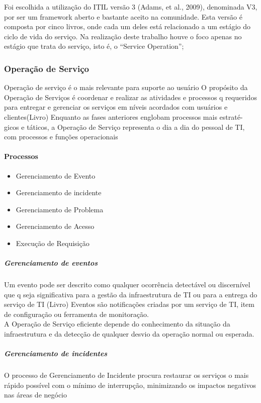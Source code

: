 \documentclass[11pt,a4paper]{article}
\begin{document}
Foi escolhida a utilização do ITIL versão 3 (Adams, et al., 2009), denominada
V3, por ser um framework aberto e bastante aceito na comunidade. Esta versão é
composta por cinco livros, onde cada um deles está relacionado a um estágio do
ciclo de vida do serviço. Na realização deste trabalho houve o foco apenas no
estágio que trata do serviço, isto é, o “Service Operation”;\\

\subsubsection{Operação de Serviço}
Operação de serviço é o mais relevante para suporte ao usuário
O propósito da Operação de Serviços é coordenar e realizar as atividades e processos q
requeridos para entregar e gerenciar os serviços em níveis acordados com usuários e
clientes(Livro)
Enquanto as fases anteriores englobam processos mais estraté-
gicos e táticos, a Operação de Serviço representa o dia a dia do pessoal de TI, com processos e
funções operacionais

\paragraph{Processos}
\begin{itemize}[noitemsep]
	\item Gerenciamento de Evento
	\item Gerenciamento de incidente
	\item Gerenciamento de Problema
	\item Gerenciamento de Acesso
	\item Execução de Requisição
\end{itemize}

\subparagraph{Gerenciamento de eventos}
Um evento pode ser descrito como qualquer ocorrência detectável ou discernível que q
seja significativa para a gestão da infraestrutura de TI ou para a entrega do serviço de TI (Livro)
Eventos são notificações criadas por um serviço de TI, item de configuração ou ferramenta
de monitoração.\\ A Operação de Serviço eficiente depende do conhecimento da situação
da infraestrutura e da detecção de qualquer desvio da operação normal ou esperada.


\subparagraph{Gerenciamento de incidentes}
O processo de Gerenciamento de Incidente procura restaurar os serviços o mais rápido
possível com o mínimo de interrupção, minimizando os impactos negativos nas áreas de negócio
\end{document}
